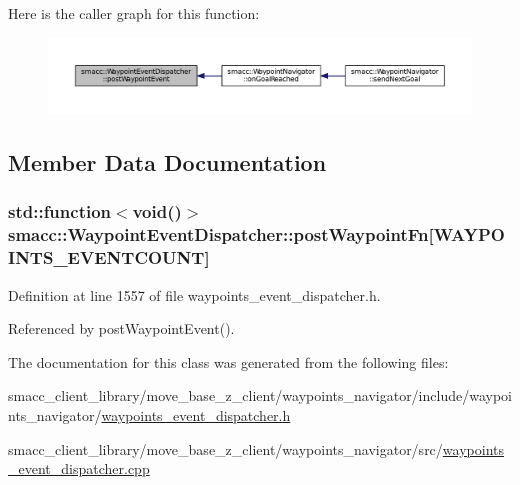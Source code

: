 Here is the caller graph for this function\+:
\nopagebreak
\begin{figure}[H]
\begin{center}
\leavevmode
\includegraphics[width=350pt]{classsmacc_1_1WaypointEventDispatcher_a6bd85034cb55795930741301a6077fe5_icgraph}
\end{center}
\end{figure}




\subsection{Member Data Documentation}
\subsubsection[{\texorpdfstring{post\+Waypoint\+Fn}{postWaypointFn}}]{\setlength{\rightskip}{0pt plus 5cm}std\+::function$<$void()$>$ smacc\+::\+Waypoint\+Event\+Dispatcher\+::post\+Waypoint\+Fn\mbox{[}{\bf W\+A\+Y\+P\+O\+I\+N\+T\+S\+\_\+\+E\+V\+E\+N\+T\+C\+O\+U\+NT}\mbox{]}\hspace{0.3cm}{\ttfamily [private]}}\hypertarget{classsmacc_1_1WaypointEventDispatcher_a6bccf6a93a827634b7b5e67ac0e4ec57}{}\label{classsmacc_1_1WaypointEventDispatcher_a6bccf6a93a827634b7b5e67ac0e4ec57}


Definition at line 1557 of file waypoints\+\_\+event\+\_\+dispatcher.\+h.



Referenced by post\+Waypoint\+Event().



The documentation for this class was generated from the following files\+:\begin{DoxyCompactItemize}
\item 
smacc\+\_\+client\+\_\+library/move\+\_\+base\+\_\+z\+\_\+client/waypoints\+\_\+navigator/include/waypoints\+\_\+navigator/\hyperlink{waypoints__event__dispatcher_8h}{waypoints\+\_\+event\+\_\+dispatcher.\+h}\item 
smacc\+\_\+client\+\_\+library/move\+\_\+base\+\_\+z\+\_\+client/waypoints\+\_\+navigator/src/\hyperlink{waypoints__event__dispatcher_8cpp}{waypoints\+\_\+event\+\_\+dispatcher.\+cpp}\end{DoxyCompactItemize}
